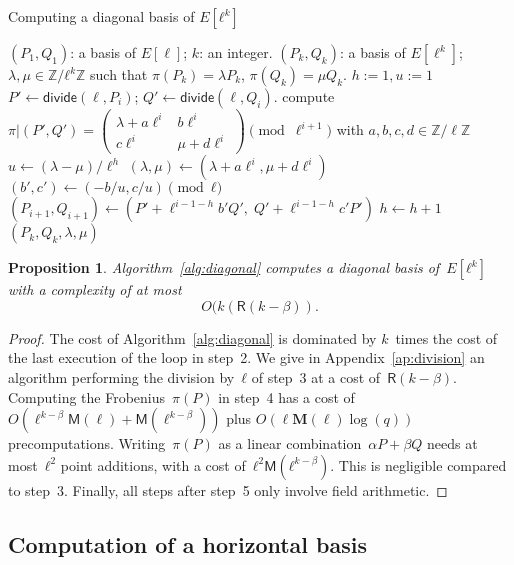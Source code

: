 \documentclass{lms}
\newtheorem{prop}[thm]{Proposition}
\begin{document}
\begin{algorithm}
\caption{\label{alg:diagonal}Computing a diagonal basis of $E[ℓ^k]$}
\begin{algorithmic}[1]
\REQUIRE $(P_1, Q_1 )$: a basis of $E[\ell]$;
$k$: an integer.
\ENSURE $(P_k, Q_k )$: a basis of $E[\ell^k]$;
$λ, μ ∈ ℤ/ℓ^k ℤ$
such that $\pi(P_k)= λ P_k$, $ \pi(Q_k)= μ Q_k$.
\STATE $h:=1, u:=1$
\STATE $P' \leftarrow \mathsf{divide}(\ell, P_i)$; $Q' \leftarrow \mathsf{divide}(\ell, Q_i)$.
\STATE compute $\pi|(P',Q')=\left( \begin{array}{cc}
λ + a\ell^{i} & b\ell^{i}\\
c\ell^{i} & μ + d\ell^{i}
\end{array} \right) \pmod {\ell^{i+1}}$
with $a,b,c,d \in \mathbb{Z}/\ell\mathbb{Z}$
\STATE $u \leftarrow (λ -μ)/\ell^h$
\ENDIF
\STATE $(λ, μ) \gets
  (λ + a\ell^i, μ + d\ell^i)$
\STATE $(b',c') \gets (-b/u , c/u) \pmod{ℓ}$
\STATE $(P_{i+1},Q_{i+1}) \gets
  (P'+\ell^{i-1-h}b' Q',\;Q'+\ell^{i-1-h}c' P')$
\STATE $h \leftarrow h+1$
\ENDIF
\ENDFOR
\RETURN $(P_{k},Q_{k},λ,μ)$
\end{algorithmic}
\end{algorithm}
\begin{prop}
Algorithm~\ref{alg:diagonal} computes a diagonal basis of~$E[ℓ^k]$
with a complexity of at most \vskip -20pt
\begin{equation*}
O(k(\mathsf{R}(k-\beta)).
\end{equation*}

\end{prop}
\begin{proof}
The cost of Algorithm~\ref{alg:diagonal} is dominated
by $k$~times the cost of the last execution of the loop in step~2.
We give in Appendix~\ref{ap:division} an algorithm
performing the division by~$ℓ$ of step~3 at a cost of~$\mathsf R(k-\beta)$.
Computing the Frobenius~$π(P)$ in step~4 has a cost of~$O(\ell^{k-\beta}\mathsf{M}(\ell)+\mathsf{M}(\ell^{k-\beta}))$ plus $O(\ell \mathbf{M}(\ell) \log(q))$ precomputations.
Writing~$π(P)$ as a linear combination~$α P + β Q$
needs at most~$ℓ^2$ point additions, with a cost of~$ℓ^2 \mathsf{M}(ℓ^{k-\beta})$.
This is %
negligible compared to step~3.
Finally, all steps after step~5 only involve field arithmetic.
\end{proof}

\subsection{Computation of a horizontal basis}
\label{ss:horizontal}
\end{document}

